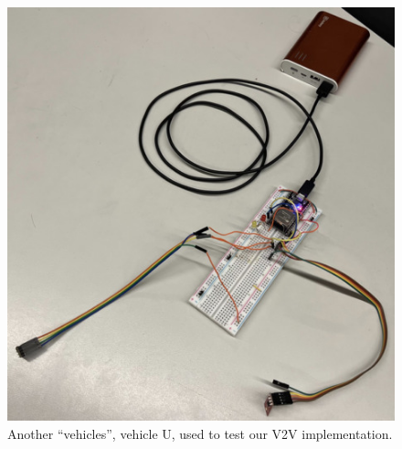 \documentclass[conference]{IEEEtran}
\begin{document}
\begin{figure}[htbp]
\centerline{\includegraphics[width=\linewidth]{pics/up_internals.jpg}}
\caption{Another ``vehicles'', vehicle U, used to test our V2V implementation.}
\label{vehicle_up}
\end{figure}
\end{document}
